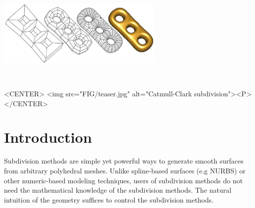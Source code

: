 
\ccParDims

\label{chapterSubdivision}



\minitoc

\begin{ccTexOnly}
  \begin{center}
    \parbox{0.6\textwidth}{%
      \includegraphics[width=0.6\textwidth]{Subdivision_method_3/FIG/teaser}
    }\\ \vspace{0.5cm}
  \end{center}
\end{ccTexOnly}

\begin{ccHtmlOnly}
     <CENTER>
         <img src="FIG/teaser.jpg" alt="Catmull-Clark subdivision"><P>
     </CENTER>
\end{ccHtmlOnly}

\section{Introduction\label{sectionSubIntro}}

Subdivision methods are simple yet powerful ways to 
generate smooth surfaces from arbitrary polyhedral meshes. 
Unlike spline-based surfaces (e.g NURBS) or other numeric-based 
modeling techniques, users of subdivision
methods do not need the mathematical knowledge of 
the subdivision methods. 
The natural intuition of the geometry suffices to control the 
subdivision methods. 

